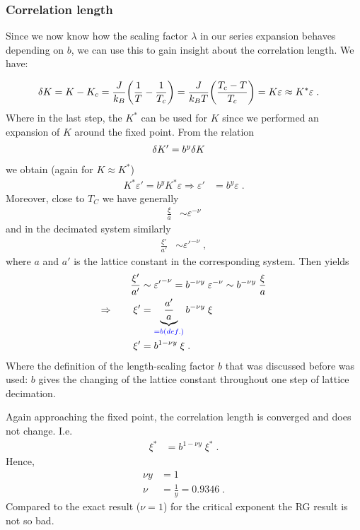 \subsubsection{Correlation length}
Since we now know how the scaling factor $\lambda$ in our series expansion behaves depending on $b$, we can use this to gain insight about the correlation length. We have:

%
\begin{align*}
\var K &= K - K_{c} = \frac{J}{k_{B} } \qty(\frac{1}{T} - \frac{1}{T_{c}})
= \frac{J}{k_{B} T} \qty(\frac{T_{c}-T}{T_{c}}) = K \varepsilon \approx K^* \varepsilon\;.
\end{align*}
%
Where in the last step, the $K^*$ can be used for $K$ since we performed an expansion of $K$ around the fixed point. From the relation
%
\begin{align*}
\var K' &= b^{y} \var K
\end{align*}
%
we obtain (again for $K\approx K^*$)
\begin{align}\label{eq:epsilon}
K^*\varepsilon' = b^y K^*\varepsilon \Rightarrow \varepsilon' &= b^{y} \varepsilon\;.
\end{align}
%
Moreover, close to $T_{C}$ we have generally
%
\begin{align*}
\frac{\xi}{a} &\sim \varepsilon^{-\nu}
\end{align*}
%
and in the decimated system similarly
%
\begin{align*}
\frac{\xi'}{a'} &\sim {\varepsilon'}^{-\nu}\;,
\end{align*}
%
where $a$ and $a'$ is the lattice constant in the corresponding system.
Then  yields
%
\begin{align*}
\frac{\xi'}{a'} &\sim  {\varepsilon'}^{-\nu} =  b^{-\nu y}\;\varepsilon^{-\nu}\sim   b^{-\nu y}\;\frac{\xi}{a}\\
\Rightarrow\qquad \xi' &=  \underbrace{
\frac{a'}{a}
}_{\color{blue} = b (def.)} b^{- \nu y} \;\xi\\
\xi' &= b^{1 - \nu y} \;\xi\;.
\end{align*}
%
Where the definition of the length-scaling factor $b$ that was discussed before was used: $b$ gives the changing of the lattice constant throughout one step of lattice decimation.

Again approaching the fixed point, the correlation length is converged and does not change. I.e.
%
\begin{align*}
\xi^{*} &= b^{1 - \nu y} \;\xi^{*}\;.
\end{align*}
%
Hence,
%
\begin{align*}
\nu y  &= 1\\
\nu &= \frac{1}{y} = 0.9346\;.
\end{align*}
%
Compared to the exact result ($\nu=1$) for the critical exponent the RG result is not so bad.




